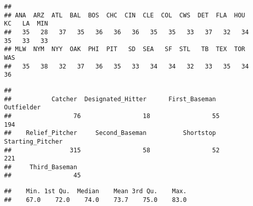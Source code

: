 \documentclass[
]{article}
\newenvironment{Shaded}{\begin{snugshade}}{\end{snugshade}}
\newcommand{\FunctionTok}[1]{\textcolor[rgb]{0.00,0.00,0.00}{#1}}
\newcommand{\NormalTok}[1]{#1}
\newcommand{\SpecialCharTok}[1]{\textcolor[rgb]{0.00,0.00,0.00}{#1}}
\begin{document}
\begin{Shaded}
\end{Shaded}

\begin{verbatim}
## 
## ANA  ARZ  ATL  BAL  BOS  CHC  CIN  CLE  COL  CWS  DET  FLA  HOU   KC   LA  MIN  
##   35   28   37   35   36   36   36   35   35   33   37   32   34   35   33   33 
## MLW  NYM  NYY  OAK  PHI  PIT   SD  SEA   SF  STL   TB  TEX  TOR  WAS  
##   35   38   32   37   36   35   33   34   34   32   33   35   34   36
\end{verbatim}

\begin{Shaded}
\end{Shaded}

\begin{verbatim}
## 
##           Catcher  Designated_Hitter      First_Baseman         Outfielder  
##                 76                 18                 55                194 
##    Relief_Pitcher     Second_Baseman          Shortstop   Starting_Pitcher  
##                315                 58                 52                221 
##     Third_Baseman  
##                 45
\end{verbatim}

\begin{Shaded}
\end{Shaded}

\begin{verbatim}
##    Min. 1st Qu.  Median    Mean 3rd Qu.    Max. 
##    67.0    72.0    74.0    73.7    75.0    83.0
\end{verbatim}

\begin{Shaded}
\end{Shaded}
\end{document}
